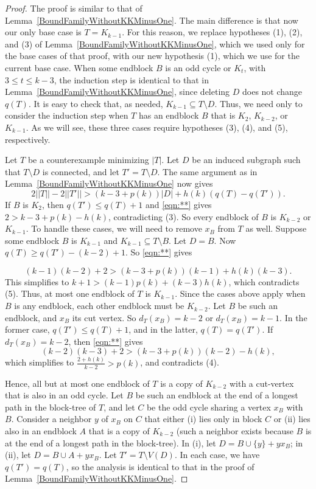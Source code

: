 \documentclass[12pt]{article}
\theoremstyle{plain}
\theoremstyle{definition}
\theoremstyle{remark}
\newcommand{\card}[1]{\left|#1\right|}
\newcommand{\parens}[1]{\left( #1 \right)}
\begin{document}
\begin{proof}

The proof is similar to that of Lemma~\ref{BoundFamilyWithoutKKMinusOne}.  The
main difference is that now our only base case is $T=K_{k-1}$.  For this
reason, we replace hypotheses (1), (2), and (3) of
Lemma~\ref{BoundFamilyWithoutKKMinusOne}, which we used only for the base cases
of that proof, with our new hypothesis (1), which we use for the current base
case.  When some endblock $B$ is an odd cycle or $K_t$, with $3\le t\le k-3$,
the induction step is identical to that in
Lemma~\ref{BoundFamilyWithoutKKMinusOne}, since deleting $D$ does not change
$q(T)$.
It is easy to check that, as needed, $K_{k-1}\subseteq T\setminus D$.  Thus, we
need only to consider the induction step when $T$ has an endblock $B$ that is
$K_2$, $K_{k-2}$, or $K_{k-1}$.  As we will see, these three cases require
hypotheses (3), (4), and (5), respectively.
    
Let $T$ be a counterexample minimizing $|T|$.  Let $D$ be an induced subgraph
such that $T\setminus D$ is connected, and let $T'=T\setminus D$. The same
argument as in Lemma~\ref{BoundFamilyWithoutKKMinusOne} now gives
    \begin{equation}
		2||T||-2||T'|| > (k-3 + p(k))\card{D} + h(k)\parens{q(T) -
q(T')}.\tag{**}\label{eqn:**}
	\end{equation}
If $B$ is $K_2$, then $q(T') \le q(T) + 1$ and \eqref{eqn:**} gives $2 > k-3 +
p(k) - h(k)$, contradicting (3).
So every endblock of $B$ is $K_{k-2}$ or $K_{k-1}$. To handle these cases, we
will need to remove $x_B$ from $T$ as well.  Suppose some endblock $B$ is
$K_{k-1}$ and $K_{k-1} \subseteq T\setminus B$.  Let $D=B$.  Now
$q(T) \ge q(T')-(k-2)+1$.  So \eqref{eqn:**} gives
	
\[ (k-1)(k-2)+2 > (k-3+p(k))(k-1)+h(k)(k-3).\]
This simplifies to $k+1 > (k-1)p(k)+(k-3)h(k)$, which contradicts (5).  Thus,
at most one endblock of $T$ is $K_{k-1}$.
Since the cases above apply when $B$ is any endblock, each other endblock must
be $K_{k-2}$.  Let $B$ be such an endblock, and $x_B$ its cut vertex.	So
$d_T(x_{B}) = k - 2$ or $d_T(x_{B}) = k-1$.  In the former case, $q(T') \le
q(T) + 1$, and in the latter, $q(T) = q(T')$.
If $d_T(x_{B}) = k - 2$, then \eqref{eqn:**} gives
\[(k-2)(k-3) +2 > (k-3 + p(k))(k-2) - h(k),\]
which simplifies to $\frac{2+h(k)}{k-2} > p(k)$, and contradicts (4).
	
Hence, all but at most one endblock of $T$ is a copy of $K_{k-2}$ with a
cut-vertex that is also in an odd cycle.  Let $B$ be such an endblock 
at the end of a longest path in the block-tree of $T$, and let $C$ be the odd
cycle sharing a vertex $x_B$ with $B$.  Consider a neighbor $y$ 
of $x_B$ on $C$ that either (i) lies only in block $C$ or (ii) lies also in an
endblock $A$ that is a copy of $K_{k-2}$ (such a neighbor exists 
because $B$ is at the end of a longest path in the block-tree).  In (i), let
$D=B\cup\{y\}+yx_B$; in (ii), let $D=B\cup A+yx_B$.  Let $T'=T\setminus
V(D)$.	In each case, we have $q(T')=q(T)$, so the analysis is identical to that
in the proof of Lemma~\ref{BoundFamilyWithoutKKMinusOne}.
\end{proof}
\end{document}

